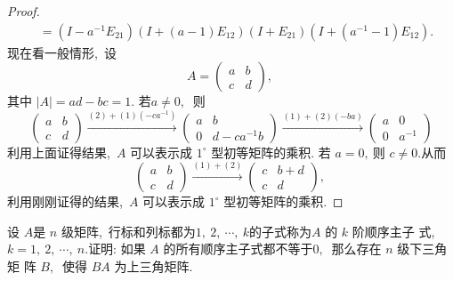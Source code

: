 \begin{proof}
$$\begin{aligned}
		& =\left(I-a^{-1} E_{21}\right)\left(I+(a-1) E_{12}\right)\left(I+E_{21}\right)\left(I+\left(a^{-1}-1\right) E_{12}\right) .
	\end{aligned}$$
	现在看一般情形,\  设
	$$A=\left(\begin{array}{ll}
		a & b \\
		c & d
	\end{array}\right),\ $$
	其中 $ |A|=a d-b c=1 .$
	若$  a \neq 0 ,\ $ 则
	$$\left(\begin{array}{ll}
		a & b \\
		c & d
	\end{array}\right)\xrightarrow{(2)+(1)\left(-c a^{-1}\right)}\left(\begin{array}{cc}
		a & b \\
		0 & d-c a^{-1} b
	\end{array}\right)\xrightarrow{(1)+(2)(-b a)}\left(\begin{array}{cc}
		a & 0 \\
		0 & a^{-1}
	\end{array}\right)$$
	利用上面证得结果,\   $A $ 可以表示成 $ 1^{\circ} $ 型初等矩阵的乘积.
	若 $ a=0 ,\  $则 $ c \neq 0 .$从而
	$$\left(\begin{array}{ll}
		a & b \\
		c & d
	\end{array}\right)\xrightarrow{(1)+(2)}\left(\begin{array}{cc}
		c & b+d \\
		c & d
	\end{array}\right),\ $$
	利用刚刚证得的结果,\  $ A $ 可以表示成  $1^{\circ} $ 型初等矩阵的乘积.
\end{proof}
\newpage
\begin{problem}
	设 $ A  $是  $n$  级矩阵,\ 行标和列标都为$  1,\ 2,\  \cdots,\  k  $的子式称为$  A $ 的  $k $ 阶顺序主子 式,\ $  k=1,\ 2,\  \cdots,\  n .$证明: 如果 $ A $ 的所有顺序主子式都不等于$ 0 ,\ $ 那么存在 $ n $ 级下三角矩 阵 $ B ,\ $ 使得 $ B A $ 为上三角矩阵.
\end{problem}
